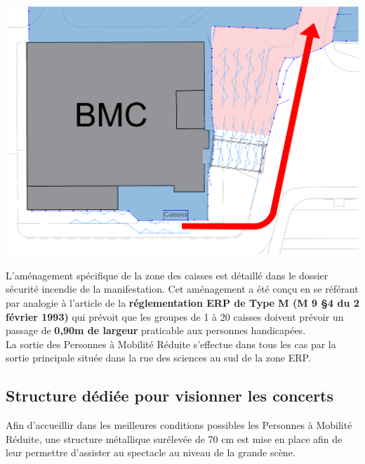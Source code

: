 \documentclass[hidelinks, paper=a4, fontsize=13pt]{report}
\begin{document}
\begin{center}
\includegraphics[width=.8\textwidth,keepaspectratio]{Exports/Plan_24h_45eme-Entree_PMR}
\end{center}

L’aménagement spécifique de la zone des caisses est détaillé dans le dossier sécurité incendie de la manifestation. Cet aménagement a été conçu en se référant par analogie à l’article de la \textbf{réglementation ERP de Type M (M 9 §4 du 2 février 1993)} qui prévoit que les groupes de 1 à 20 caisses doivent prévoir un passage de \textbf{0,90m de largeur} praticable aux personnes handicapées. \\

La sortie des Personnes à Mobilité Réduite s’effectue dans tous les cas par la sortie principale située dans la rue des sciences au sud de la zone ERP.

\subsection{Structure dédiée pour visionner les concerts}

Afin d’accueillir dans les meilleures conditions possibles les Personnes à Mobilité Réduite, une structure métallique surélevée de 70 cm est mise en place afin de leur permettre d’assister au spectacle au niveau de la grande scène.\\
\end{document}
